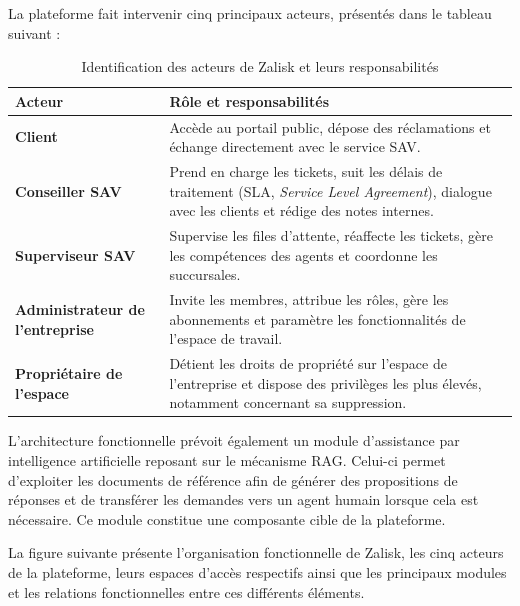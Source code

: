 \documentclass[12pt, a4paper]{report}
\begin{document}
La plateforme fait intervenir cinq principaux acteurs, présentés dans le tableau suivant :

\begin{table}[htbp]
    \centering
    \caption{Identification des acteurs de Zalisk et leurs responsabilités}
    \label{tab:acteurs-zalisk}
    \renewcommand{\arraystretch}{1.35}
    \begin{tabularx}{\textwidth}{|>{\bfseries}p{4.2cm}|X|}
        \hline
        \rowcolor[gray]{0.92} Acteur & Rôle et responsabilités \\
        \hline
        Client & Accède au portail public, dépose des réclamations et échange directement avec le service SAV. \\
        \hline
        Conseiller SAV & Prend en charge les tickets, suit les délais de traitement (SLA, \textit{Service Level Agreement}), dialogue avec les clients et rédige des notes internes. \\
        \hline
        Superviseur SAV & Supervise les files d'attente, réaffecte les tickets, gère les compétences des agents et coordonne les succursales. \\
        \hline
        Administrateur de l'entreprise & Invite les membres, attribue les rôles, gère les abonnements et paramètre les fonctionnalités de l'espace de travail. \\
        \hline
        Propriétaire de l'espace & Détient les droits de propriété sur l'espace de l'entreprise et dispose des privilèges les plus élevés, notamment concernant sa suppression. \\
        \hline
    \end{tabularx}
\end{table}

L'architecture fonctionnelle prévoit également un module d'assistance par intelligence artificielle reposant sur le mécanisme RAG. Celui-ci permet d'exploiter les documents de référence afin de générer des propositions de réponses et de transférer les demandes vers un agent humain lorsque cela est nécessaire. Ce module constitue une composante cible de la plateforme.

La figure suivante présente l'organisation fonctionnelle de Zalisk, les cinq acteurs de la plateforme, leurs espaces d'accès respectifs ainsi que les principaux modules et les relations fonctionnelles entre ces différents éléments.

\end{document}
